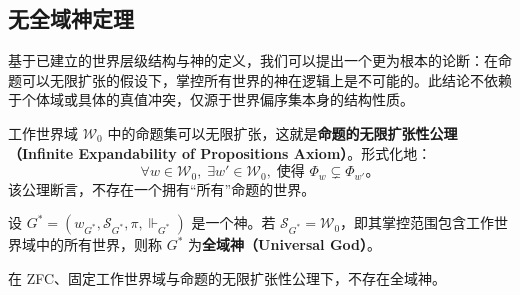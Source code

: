 \subsection{无全域神定理}\label{subsec:no-god}

基于已建立的世界层级结构与神的定义，我们可以提出一个更为根本的论断：在命题可以无限扩张的假设下，掌控所有世界的神在逻辑上是不可能的。此结论不依赖于个体域或具体的真值冲突，仅源于世界偏序集本身的结构性质。

\begin{axiom}[命题的无限扩张性]
    工作世界域 \( \mathcal{W}_0 \) 中的命题集可以无限扩张，这就是\textbf{命题的无限扩张性公理（Infinite Expandability of Propositions Axiom）}。形式化地：
    \begin{equation}
        \forall w \in \mathcal{W}_0,\; \exists w' \in \mathcal{W}_0,\; \text{使得 } \Phi_w \subsetneq \Phi_{w'}。
    \end{equation}
    该公理断言，不存在一个拥有“所有”命题的世界。
\end{axiom}

\begin{definition}[全域神]
    设 \( G^* = (w_{G^*}, \mathcal{S}_{G^*}, \pi, \Vdash_{G^*}) \) 是一个神。若 \( \mathcal{S}_{G^*} = \mathcal{W}_0 \)，即其掌控范围包含工作世界域中的所有世界，则称 \( G^* \) 为\textbf{全域神（Universal God）}。
\end{definition}


\begin{theorem}\label{thm:no-god}
    在 ZFC、固定工作世界域与命题的无限扩张性公理下，不存在全域神。
\end{theorem}

